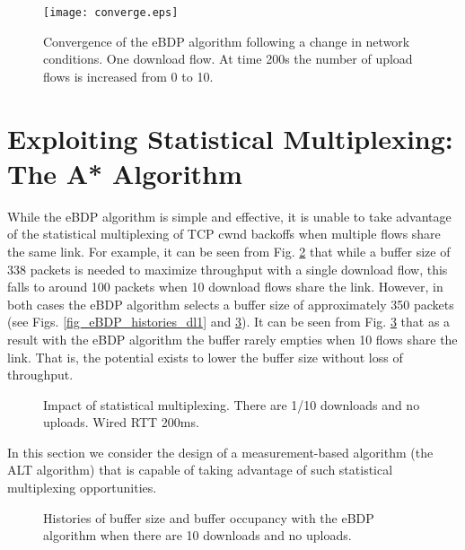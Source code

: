 \documentclass[10pt,twocolumn, journal]{IEEEtran}
\begin{document}
\begin{figure}[tb]
   \centering
   {\texttt{[image: converge.eps]}
   \label{fig_eBDP_converge_w_0.001}}
\caption{Convergence of the eBDP algorithm following a change in network conditions.
   One download flow. At time 200s the number of upload flows is increased from 0 to 10. }
   \label{fig_eBDP_converge}
\end{figure}


\section{Exploiting Statistical Multiplexing: The A* Algorithm}\label{sec_astar}

While the eBDP algorithm is simple and effective, it is unable to take advantage of the
statistical multiplexing of TCP cwnd backoffs when multiple flows share the same link. For example, it can be seen from Fig. \ref{fig_multiplexing} that while a buffer size of 338 packets is needed to maximize throughput with a single download flow, this falls to around 100 packets when 10 download flows share the link. However, in both cases the eBDP algorithm selects a
buffer size of approximately 350 packets (see Figs. \ref{fig_eBDP_histories_dl1} and
\ref{fig_eBDP_histories10}).   It can be seen from Fig. \ref{fig_eBDP_histories10} that as a result with the eBDP algorithm the buffer rarely empties when 10 flows share the link. That is, the potential exists to lower the buffer size without loss of throughput.

\begin{figure}[tb]
   \centering
   \hfil
   \caption{Impact of statistical multiplexing.
      There are 1/10 downloads and no uploads.
      Wired RTT 200ms.}
   \label{fig_multiplexing}
\end{figure}

In this section we consider the design of a measurement-based algorithm (the ALT algorithm) that is capable of taking advantage of such statistical multiplexing opportunities.

\begin{figure}[tb]
   \centering
   \hfil
\caption{Histories of buffer size and buffer occupancy with the eBDP algorithm
   when there are 10 downloads and no uploads.}
   \label{fig_eBDP_histories10}
\end{figure}
\end{document}
